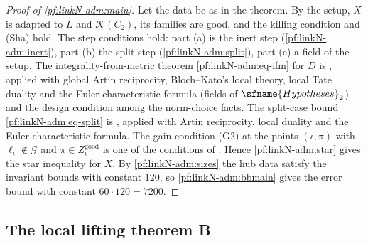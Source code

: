 \begin{proof}[Proof of \cref{pf:linkN-adm:main}]
Let the data be as in the theorem. By the setup, $X$ is adapted to $L$ and $\mathcal K(C_2)$, its families are good, and
the killing condition and (Sha) hold. The step conditions hold: part (a) is the inert step
(\cref{pf:linkN-adm:inert}), part (b) the split step (\cref{pf:linkN-adm:split}), part (c) a field of the setup. The
integrality-from-metric theorem \eqref{pf:linkN-adm:eq-ifm} for $D$ is
, applied with global Artin reciprocity, Bloch--Kato's
local theory, local Tate duality and the Euler characteristic formula (fields of $\sfname{Hypotheses}_2$) and the design
condition among the norm-choice facts. The split-case bound \eqref{pf:linkN-adm:eq-split} is
, applied with Artin reciprocity, local duality and
the Euler characteristic formula. The gain condition (G2) at the points $(\iota,\pi)$ with $\ell_\iota\notin\mathcal G$ and
$\pi\in Z^{\mathrm{good}}_\iota$ is one of the conditions of . Hence
\cref{pf:linkN-adm:star} gives the star inequality for $X$. By \cref{pf:linkN-adm:sizes} the hub data satisfy the invariant bounds
with constant $120$, so \cref{pf:linkN-adm:bbmain} gives the error bound with constant $60\cdot120=7200$.
\end{proof}

\subsection{The local lifting theorem B}\label{pf:linkN-adm:thmBsec}

